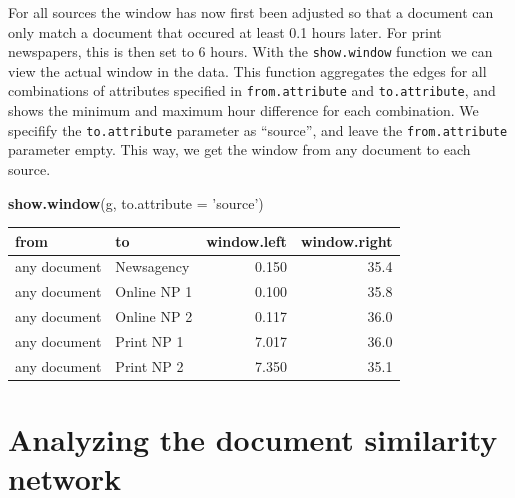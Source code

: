 \documentclass[]{article}
\newenvironment{Shaded}{\begin{snugshade}}{\end{snugshade}}
\newcommand{\KeywordTok}[1]{\textcolor[rgb]{0.13,0.29,0.53}{\textbf{{#1}}}}
\newcommand{\DataTypeTok}[1]{\textcolor[rgb]{0.13,0.29,0.53}{{#1}}}
\newcommand{\DecValTok}[1]{\textcolor[rgb]{0.00,0.00,0.81}{{#1}}}
\newcommand{\FloatTok}[1]{\textcolor[rgb]{0.00,0.00,0.81}{{#1}}}
\newcommand{\StringTok}[1]{\textcolor[rgb]{0.31,0.60,0.02}{{#1}}}
\newcommand{\CommentTok}[1]{\textcolor[rgb]{0.56,0.35,0.01}{\textit{{#1}}}}
\newcommand{\NormalTok}[1]{{#1}}
\begin{document}
\begin{Shaded}
\end{Shaded}

For all sources the window has now first been adjusted so that a
document can only match a document that occured at least 0.1 hours
later. For print newspapers, this is then set to 6 hours. With the
\texttt{show.window} function we can view the actual window in the data.
This function aggregates the edges for all combinations of attributes
specified in \texttt{from.attribute} and \texttt{to.attribute}, and
shows the minimum and maximum hour difference for each combination. We
specifify the \texttt{to.attribute} parameter as ``source'', and leave
the \texttt{from.attribute} parameter empty. This way, we get the window
from any document to each source.

\begin{Shaded}
\begin{Highlighting}[]
\KeywordTok{show.window}\NormalTok{(g, }\DataTypeTok{to.attribute =} \StringTok{'source'}\NormalTok{)}
\end{Highlighting}
\end{Shaded}

\begin{longtable}[c]{@{}llrr@{}}
\toprule
from & to & window.left & window.right\tabularnewline
\midrule
\endhead
any document & Newsagency & 0.150 & 35.4\tabularnewline
any document & Online NP 1 & 0.100 & 35.8\tabularnewline
any document & Online NP 2 & 0.117 & 36.0\tabularnewline
any document & Print NP 1 & 7.017 & 36.0\tabularnewline
any document & Print NP 2 & 7.350 & 35.1\tabularnewline
\bottomrule
\end{longtable}

\section{Analyzing the document similarity
network}\label{analyzing-the-document-similarity-network}
\end{document}
